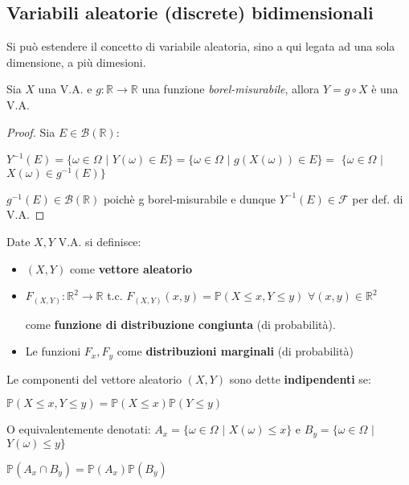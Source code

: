 \vspace{20px}

\subsection{Variabili aleatorie (discrete) bidimensionali}

Si può estendere il concetto di variabile aleatoria, sino a qui legata ad una sola dimensione, a più dimesioni. 

\vspace{15px}

\begin{proposition}
Sia $X$ una V.A. e $g:\mathbb{R}\longrightarrow\mathbb{R}$ una funzione \textit{borel-misurabile}, allora $Y=g\circ X$ è una V.A.
\begin{proof}
Sia $E\in\mathcal{B}(\mathbb{R})$:
\begin{center}
    $Y^{-1}(E)=\{\omega\in\Omega$ $|$ $Y(\omega)\in E\}=\{\omega\in\Omega$ $|$ $g(X(\omega))\in E\}=$
    \newline
    $\{\omega\in\Omega$ $|$ $X(\omega)\in g^{-1}(E)\}$
\end{center}
$g^{-1}(E)\in\mathcal{B}(\mathbb{R})$ poichè g borel-misurabile e dunque $Y^{-1}(E)\in\mathscr{F}$ per def. di V.A.
\end{proof}
\end{proposition}
\vspace{10px}
\begin{definition}
Date $X,Y$ V.A. si definisce:
\begin{itemize}
    \item $(X,Y)$ come \textbf{vettore aleatorio}
    \item \begin{center}
    $F_{(X,Y)}:\mathbb{R}^2\longrightarrow\mathbb{R}$ t.c. $F_{(X,Y)}(x,y)=\mathbb{P}(X\leq x, Y\leq y)$
    \hspace{4px}
    $\forall (x,y)\in\mathbb{R}^2$
    \end{center}
    come \textbf{funzione di distribuzione congiunta} (di probabilità).
    \item Le funzioni $F_x,F_y$ come \textbf{distribuzioni marginali} (di probabilità)
\end{itemize}
\end{definition}

\begin{definition}
Le componenti del vettore aleatorio $(X,Y)$ sono dette \newline \textbf{indipendenti} se:
\begin{center}
    $\mathbb{P}(X\leq x, Y\leq y)=\mathbb{P}(X\leq x)\mathbb{P}(Y\leq y)$
\end{center}
O equivalentemente denotati: $A_x=\{\omega\in\Omega$ $|$ $X(\omega)\leq x\}$ e $B_y=\{\omega\in\Omega$ $|$ $Y(\omega)\leq y\}$
\begin{center}
    $\mathbb{P}(A_x\cap B_y)=\mathbb{P}(A_x)\mathbb{P}(B_y)$
\end{center}
\end{definition}

